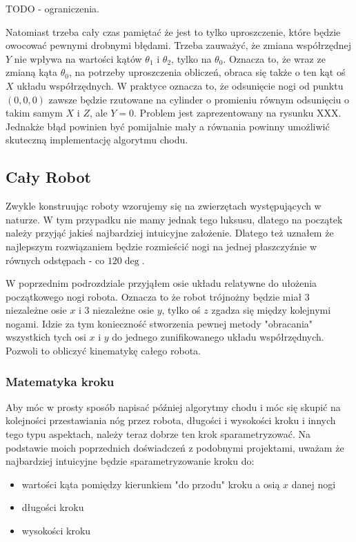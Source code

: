 \documentclass[a4paper,13pt]{article}
\begin{document}
TODO - ograniczenia.

Natomiast trzeba cały czas pamiętać że jest to tylko uproszczenie, które będzie owocować pewnymi drobnymi błędami. Trzeba zauważyć, że zmiana współrzędnej $Y$ nie wpływa na wartości kątów $\theta_1$ i $\theta_2$, tylko na $\theta_0$. Oznacza to, że wraz ze zmianą kąta $\theta_0$, na potrzeby uproszczenia obliczeń, obraca się także o ten kąt oś $X$ układu współrzędnych. W praktyce oznacza to, że odsunięcie nogi od punktu $(0, 0, 0)$ zawsze będzie rzutowane na cylinder o promieniu równym odsunięciu o takim samym $X$ i $Z$, ale $Y = 0$. Problem jest zaprezentowany na rysunku XXX. Jednakże błąd powinien być pomijalnie mały a równania powinny umożliwić skuteczną implementację algorytmu chodu.

\subsection{Cały Robot}
Zwykle konstruując roboty wzorujemy się na zwierzętach występujących w naturze. W tym przypadku nie mamy jednak tego luksusu, dlatego na początek należy przyjąć jakieś najbardziej intuicyjne założenie. Dlatego też uznałem że najlepszym rozwiązaniem będzie rozmieścić nogi na jednej płaszczyźnie w równych odstępach - co $120\deg$.

W poprzednim podrozdziale przyjąłem osie układu relatywne do ułożenia początkowego nogi robota. Oznacza to że robot trójnożny będzie miał 3 niezależne osie $x$ i 3 niezależne osie $y$, tylko oś $z$ zgadza się między kolejnymi nogami. Idzie za tym konieczność stworzenia pewnej metody "obracania" wszystkich tych osi $x$ i $y$ do jednego zunifikowanego układu współrzędnych. Pozwoli to obliczyć kinematykę całego robota.

\subsubsection{Matematyka kroku}
Aby móc w prosty sposób napisać później algorytmy chodu i móc się skupić na kolejności przestawiania nóg przez robota, długości i wysokości kroku i innych tego typu aspektach, należy teraz dobrze ten krok sparametryzować. Na podstawie moich poprzednich doświadczeń z podobnymi projektami, uważam że najbardziej intuicyjne będzie sparametryzowanie kroku do:
\begin{itemize}
\item wartości kąta pomiędzy kierunkiem "do przodu" kroku a osią $x$ danej nogi
\item długości kroku
\item wysokości kroku
\end{itemize}
\end{document}
